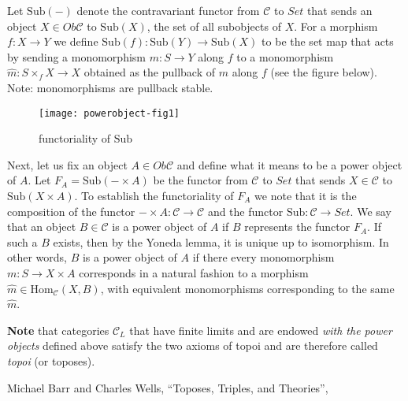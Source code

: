 \documentclass[12pt]{article}
\newcommand{\cC}{{\mathcal{C}}}
\newcommand{\Set}{\mathit{Set}}
\newcommand{\Hom}{\mathrm{Hom}}
\newcommand{\Sub}{\mathrm{Sub}}
\newcommand{\hm}{\hat{m}}
\begin{document}
Let $\Sub(-)$ denote the contravariant functor from $\cC$ to $\Set$
that sends an object $X\in Ob \cC$ to $\Sub(X)$, the set of all
subobjects of $X$.  For a morphism $f:X\to Y$ we define $\Sub(f):
\Sub(Y)\to \Sub(X)$ to be the set map that acts by sending a
monomorphism $m:S\to Y$ along $f$ to a monomorphism
$\hm:S\times_f X\to X$ obtained as the pullback of $m$ along $f$ (see the
figure below).
Note: monomorphisms are pullback stable.
\begin{figure}[h]
  \centering
  \texttt{[image: powerobject-fig1]}
  \caption{functoriality of $\Sub$}
  \label{fig:1}
\end{figure}



Next, let us fix an object $A\in Ob \cC$ and define what it means to be a
power object of $A$.  Let $F_A= \Sub(-\times A)$ be the functor from
$\cC$ to $\Set$ that sends $X\in \cC$ to $\Sub(X\times A)$.  To
establish the functoriality of $F_A$ we note that it is the
composition of the functor $-\times A: \cC \to \cC$ and the functor
$\Sub:\cC \to \Set$.  We say that an object $B\in \cC$ is a power
object of $A$ if $B$ represents the functor $F_A$.  If such a $B$
exists, then by the Yoneda lemma, it is unique up to isomorphism.  In
other words, $B$ is a power object of $A$ if there every monomorphism
$m:S\to X\times A$ corresponds in a natural fashion to a morphism
$\hm \in \Hom_\cC(X,B)$, with equivalent monomorphisms corresponding to
the same $\hm$.

\textbf{Note} that categories $\cC_L$ that have finite limits and are endowed \emph{with the power objects} defined above satisfy the two axioms of topoi and are therefore called \emph{topoi} (or toposes).


\begin{thebibliography}{99}
 Michael Barr and Charles Wells, ``Toposes, Triples, and
  Theories'', 
\end{thebibliography}
\end{document}
